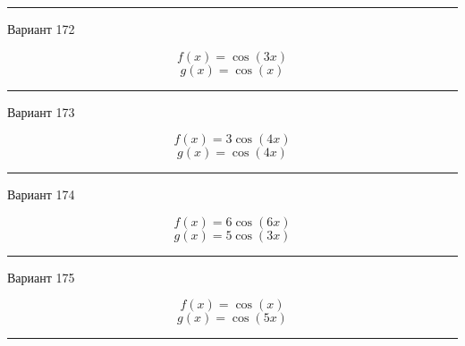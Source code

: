 \documentclass[11pt]{report}
\begin{document}
\rule{\textwidth}{.2mm}

Вариант 172

$$f(x)=\cos{\left(3 x \right)}$$
$$g(x)=\cos{\left(x \right)}$$

\rule{\textwidth}{.2mm}

Вариант 173

$$f(x)=3 \cos{\left(4 x \right)}$$
$$g(x)=\cos{\left(4 x \right)}$$

\rule{\textwidth}{.2mm}

Вариант 174

$$f(x)=6 \cos{\left(6 x \right)}$$
$$g(x)=5 \cos{\left(3 x \right)}$$

\rule{\textwidth}{.2mm}

Вариант 175

$$f(x)=\cos{\left(x \right)}$$
$$g(x)=\cos{\left(5 x \right)}$$

\rule{\textwidth}{.2mm}
\end{document}
